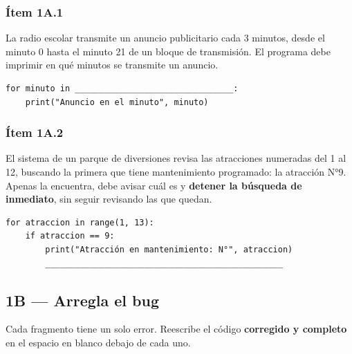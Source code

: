 \documentclass[11pt]{article}
\begin{document}
\subsubsection*{Ítem 1A.1}
La radio escolar transmite un anuncio publicitario cada 3 minutos, desde el minuto 0 hasta el minuto 21 de un bloque de transmisión. El programa debe imprimir en qué minutos se transmite un anuncio.

\begin{cajacodigo}
\begin{Verbatim}[fontsize=\small]
for minuto in ________________________________:
    print("Anuncio en el minuto", minuto)
\end{Verbatim}
\end{cajacodigo}


\subsubsection*{Ítem 1A.2}
El sistema de un parque de diversiones revisa las atracciones numeradas del 1 al 12, buscando la primera que tiene mantenimiento programado: la atracción N°9. Apenas la encuentra, debe avisar cuál es y \textbf{detener la búsqueda de inmediato}, sin seguir revisando las que quedan.

\begin{cajacodigo}
\begin{Verbatim}[fontsize=\small]
for atraccion in range(1, 13):
    if atraccion == 9:
        print("Atracción en mantenimiento: N°", atraccion)
        ________________________________________________
\end{Verbatim}
\end{cajacodigo}


\newpage
\subsection*{1B --- Arregla el bug}
Cada fragmento tiene un solo error. Reescribe el código \textbf{corregido y completo} en el espacio en blanco debajo de cada uno.
\end{document}
